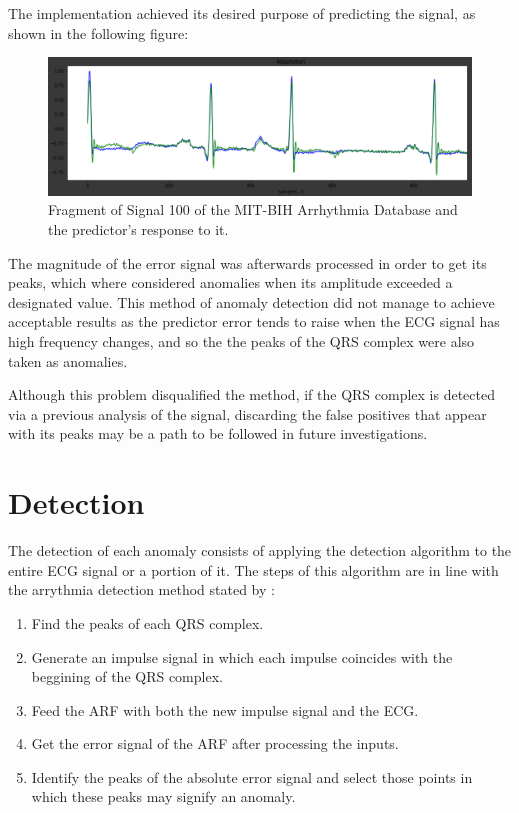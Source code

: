 \documentclass[conference]{IEEEtran}
\begin{document}
The implementation achieved its desired purpose of predicting the signal, as shown in the following figure:

\begin{figure}[H]
\centerline{\includegraphics[scale=0.35]{imagenes/prediction.png}}
\caption{Fragment of Signal 100 of the MIT-BIH Arrhythmia Database and the predictor's response to it.}
\label{fig}
\end{figure}

The magnitude of the error signal was afterwards processed in order to get its peaks, which where considered anomalies when its amplitude exceeded a designated value. This method of anomaly detection did not manage to achieve acceptable results as the predictor error tends to raise when the ECG signal has high frequency changes, and so the the peaks of the QRS complex were also taken as anomalies. \par
Although this problem disqualified the method, if the QRS complex is detected via a previous analysis of the signal, discarding the false positives that appear with its peaks may be a path to be followed in future investigations.\par

\section{Detection}

The detection of each anomaly consists of applying the detection algorithm to the entire ECG signal or a portion of it. The steps of this algorithm are in line with the arrythmia detection method stated by \cite{b1}:

\begin{enumerate}
\item Find the peaks of each QRS complex.
\item Generate an impulse signal in which each impulse coincides with the beggining of the QRS complex.  
\item Feed the ARF with both the new impulse signal and the ECG. 
\item Get the error signal of the ARF after processing the inputs.
\item Identify the peaks of the absolute error signal and select those points in which these peaks may signify an anomaly.
\end{enumerate}
\end{document}
